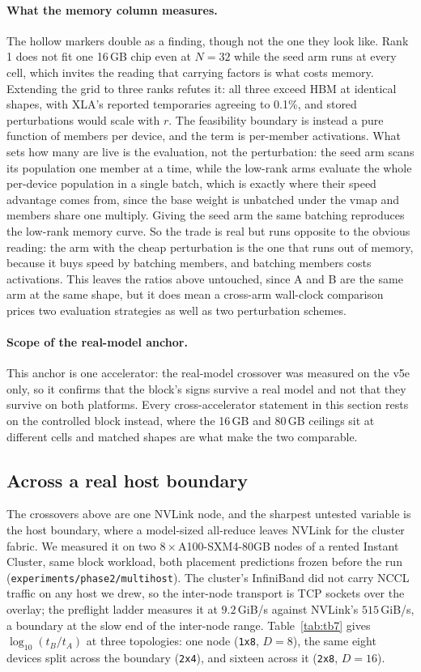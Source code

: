 \paragraph{What the memory column measures.} The hollow markers double as a
finding, though not the one they look like. Rank 1 does not fit one 16\,GB
chip even at $N{=}32$ while the seed arm runs at every cell, which invites
the reading that carrying factors is what costs memory. Extending the grid
to three ranks refutes it: all three exceed HBM at identical shapes, with
XLA's reported temporaries agreeing to 0.1\%, and stored perturbations
would scale with $r$. The feasibility boundary is instead a pure function of
members per device, and the term is per-member activations. What sets how
many are live is the evaluation, not the perturbation: the seed arm scans
its population one member at a time, while the low-rank arms evaluate the
whole per-device population in a single batch, which is exactly where their
speed advantage comes from, since the base weight is unbatched under the
$\mathrm{vmap}$ and members share one multiply. Giving the seed arm the same
batching reproduces the low-rank memory curve. So the trade is real but runs
opposite to the obvious reading: the arm with the cheap perturbation is the
one that runs out of memory, because it buys speed by batching members, and
batching members costs activations. This leaves the ratios above untouched,
since A and B are the same arm at the same shape, but it does mean a
cross-arm wall-clock comparison prices two evaluation strategies as well as
two perturbation schemes.

\paragraph{Scope of the real-model anchor.} This anchor is one accelerator: the real-model
crossover was measured on the v5e only, so it confirms that the block's signs
survive a real model and not that they survive on both platforms. Every
cross-accelerator statement in this section rests on the controlled block
instead, where the 16\,GB and 80\,GB ceilings sit at different cells and
matched shapes are what make the two comparable.


\subsection{Across a real host boundary}
\label{subsec:boundary}
The crossovers above are one NVLink node, and the sharpest untested variable
is the host boundary, where a model-sized all-reduce leaves NVLink for the
cluster fabric.
We measured it on two $8\times$A100-SXM4-80GB nodes of a rented Instant Cluster,
same block workload, both placement predictions frozen before the run
(\texttt{experiments/phase2/multihost}). The cluster's InfiniBand did not carry
NCCL traffic on any host we drew, so the inter-node transport is TCP sockets
over the overlay; the preflight ladder measures it at $9.2$\,GiB/s against
NVLink's $515$\,GiB/s, a boundary at the slow end of the inter-node range.
Table~\ref{tab:tb7} gives $\log_{10}(t_B/t_A)$ at three topologies: one node
(\texttt{1x8}, $D{=}8$), the same eight devices split across the boundary
(\texttt{2x4}), and sixteen across it (\texttt{2x8}, $D{=}16$).

